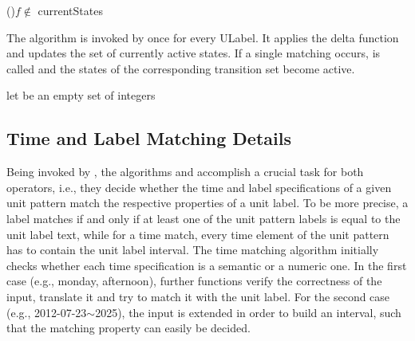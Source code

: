\begin{algorithm}[H]
  \caption{\label{alg:match}}
    \lIf(){$f\not\in$ currentStates}{\Return {}}
    \Return {}\;
\end{algorithm}

The algorithm  is invoked by  once for every ULabel. It applies the delta function and updates the set of currently active states. If a single matching occurs,  is called and the states of the corresponding transition set become active.

\begin{algorithm}
  \caption{\label{alg:updateStates}}
    let  be an empty set of integers\;
    \;
\end{algorithm}

\subsection{Time and Label Matching Details}
Being invoked by , the algorithms  and  accomplish a crucial task for both operators, i.e., they decide whether the time and label specifications of a given unit pattern match the respective properties of a unit label. To be more precise, a label matches if and only if at least one of the unit pattern labels is equal to the unit label text, while for a time match, every time element of the unit pattern has to contain the unit label interval. The time matching algorithm initially checks whether each time specification is a semantic or a numeric one. In the first case (e.g., monday, afternoon), further functions verify the correctness of the input, translate it and try to match it with the unit label. For the second case (e.g., 2012-07-23$\sim$2025), the input is extended in order to build an interval, such that the matching property can easily be decided.

